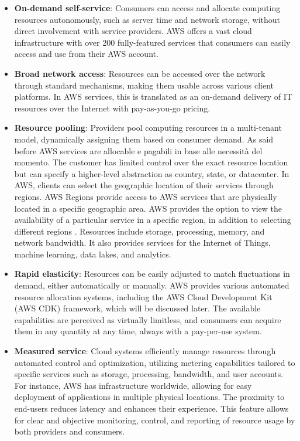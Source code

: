 \begin{itemize}
    \item \textbf{On-demand self-service}: Consumers can access and allocate computing resources autonomously, such as server time and network storage, without direct involvement with service providers. AWS offers a vast cloud infrastructure with over 200 fully-featured services that consumers can easily access and use from their AWS account.
    \item \textbf{Broad network access}: Resources can be accessed over the network through standard mechanisms, making them usable across various client platforms. In AWS services, this is translated as an on-demand delivery of IT resources over the Internet with pay-as-you-go pricing. 
    \item \textbf{Resource pooling}: Providers pool computing resources in a multi-tenant model, dynamically assigning them based on consumer demand. As said before AWS services are allocable e pagabili in base alle necessità del momento. The customer has limited control over the exact resource location but can specify a higher-level abstraction as country, state, or datacenter. In AWS, clients can select the geographic location of their services through regions. AWS Regions provide access to AWS services that are physically located in a specific geographic area. AWS provides the option to view the availability of a particular service in a specific region, in addition to selecting different regions \cite{AWSRegions}. Resources include storage, processing, memory, and network bandwidth. It also provides services for the Internet of Things, machine learning, data lakes, and analytics.
    \item \textbf{Rapid elasticity}: Resources can be easily adjusted to match fluctuations in demand, either automatically or manually. AWS provides various automated resource allocation systems, including the AWS Cloud Development Kit (AWS CDK) framework, which will be discussed later. The available capabilities are perceived as virtually limitless, and consumers can acquire them in any quantity at any time, always with a pay-per-use system.
    \item \textbf{Measured service}: Cloud systems efficiently manage resources through automated control and optimization, utilizing metering capabilities tailored to specific services such as storage, processing, bandwidth, and user accounts. For instance, AWS has infrastructure worldwide, allowing for easy deployment of applications in multiple physical locations. The proximity to end-users reduces latency and enhances their experience. This feature allows for clear and objective monitoring, control, and reporting of resource usage by both providers and consumers.
\end{itemize}

